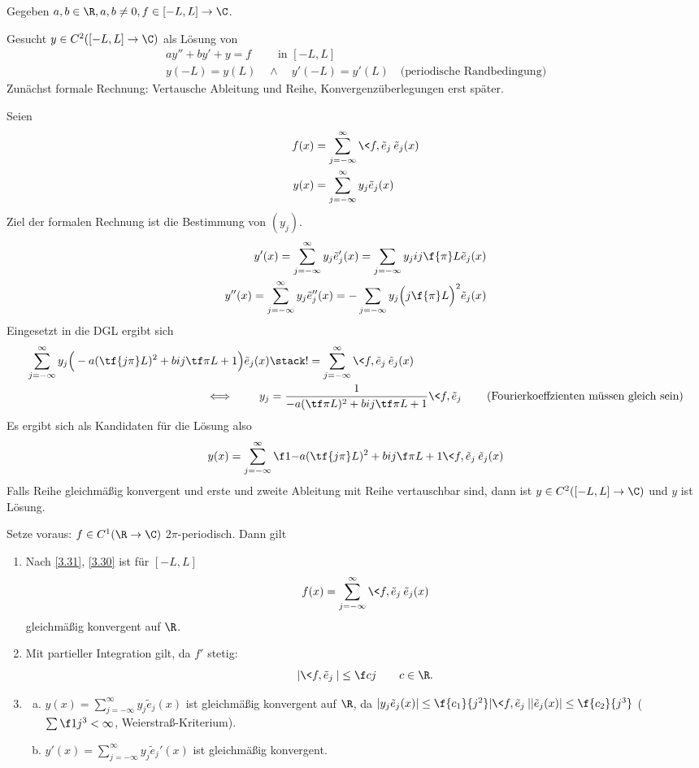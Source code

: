 \begin{ex} \label{3.36}
	Gegeben $a,b \in \R, a,b \neq 0, f \in [-L,L] \to \C$.

	Gesucht $y \in C^2([-L,L] \to \C)$ als Lösung von 
	\begin{gather*}
		ay'' + by' + y = f \qquad \text{ in $[-L,L]$} \\
		y(-L) = y(L) \quad \land \quad y'(-L) = y'(L) \quad \text{(periodische Randbedingung)}
	\end{gather*}
	Zunächst formale Rechnung: Vertausche Ableitung und Reihe, Konvergenzüberlegungen erst später.

	Seien
	\begin{align*}
		f(x) &= \sum_{j=-\infty}^\infty \<f,\tilde e_j\> \tilde e_j(x) \\
		y(x) &= \sum_{j=-\infty}^\infty y_j \tilde e_j(x)
	\end{align*}
	Ziel der formalen Rechnung ist die Bestimmung von $(y_j)$.
	\begin{align*}
		y'(x) = \sum_{j=-\infty}^\infty y_j \tilde e_j'(x) = \sum_{j=-\infty} y_j ij \f {\pi}L \tilde e_j(x) \\
		y''(x) = \sum_{j=-\infty}^\infty y_j \tilde e_j''(x) = -\sum_{j=-\infty} y_j \Big( j \f {\pi}L \Big)^2 \tilde e_j(x) 
	\end{align*}
	Eingesetzt in die DGL ergibt sich
	\begin{align*}
		\sum_{j=-\infty}^\infty y_j\Big( -a (\tf {j\pi}L)^2 + b ij \tf \pi L + 1 \Big) \tilde e_j(x)
		&\stack != \sum_{j=-\infty}^\infty \<f, \tilde e_j\> \tilde e_j(x) \\
		\iff \qquad y_j &= \dfrac 1{-a (\tf \pi L)^2 + b ij \tf \pi L + 1} \<f,\tilde e_j\>
		\qquad \text{(Fourierkoeffzienten müssen gleich sein)}
	\end{align*}
	Es ergibt sich als Kandidaten für die Lösung also
	\[
		y(x) = \sum_{j=-\infty}^\infty \f 1{-a (\tf {j\pi}L )^2 + b ij \f \pi L + 1} \<f, \tilde e_j\> \tilde e_j(x)
	\]
	Falls Reihe gleichmäßig konvergent und erste und zweite Ableitung mit Reihe vertauschbar sind, dann ist $y \in C^2([-L,L]\to \C)$ und $y$ ist Lösung.

	Setze voraus: $f \in C^1(\R \to \C)$ $2\pi$-periodisch.
	Dann gilt
	\begin{enumerate}[1)]
		\item
			Nach \ref{3.31}, \ref{3.30} ist für $[-L,L]$
			\[
				f(x) = \sum_{j=-\infty}^\infty \<f,\tilde e_j\> \tilde e_j(x)
			\]
			gleichmäßig konvergent auf $\R$.
		\item
			Mit partieller Integration gilt, da $f'$ stetig:
			\[
				|\<f, \tilde e_j\>| \le \f c j \qquad c \in \R.
			\]
		\item
			\begin{enumerate}[a)]
				\item
					$y(x) = \sum_{j=-\infty}^\infty y_j \tilde e_j(x)$ ist gleichmäßig konvergent auf $\R$, da $|y_j \tilde e_j(x)| \le \f {c_1}{j^2} |\<f, \tilde e_j\>| |\tilde e_j(x)| \le \f {c_2}{j^3}$ ($\sum \f 1{j^3} < \infty$, Weierstraß-Kriterium).
				\item
					$y'(x) = \sum_{j=-\infty}^\infty y_j \tilde e_j'(x)$ ist gleichmäßig konvergent.


\end{enumerate}
\end{enumerate}
\end{ex}
